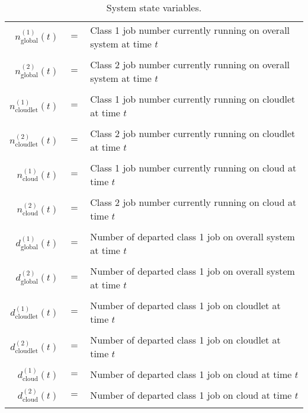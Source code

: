 \documentclass[10pt,a4paper]{article}
\begin{document}
\begin{table}[h!]
    \caption{System state variables.}
    \centering
    \small
    \label{table:StateVariables}
     \begin{tabular}{rcl}

      \toprule
      
      $n_{\text{global}}^{(1)}(t)$ & $ = $ & Class 1 job number currently running on overall system at time $t$ \\\\
	  $n_{\text{global}}^{(2)}(t)$ & $ = $ & Class 2 job number currently running on overall system at time $t$ \\\\
      
      $n_{\text{cloudlet}}^{(1)}(t)$ & $ = $ & Class 1 job number currently running on cloudlet at time $t$ \\\\
	  $n_{\text{cloudlet}}^{(2)}(t)$ & $ = $ & Class 2 job number currently running on cloudlet at time $t$ \\\\
         
      $n_{\text{cloud}}^{(1)}(t)$ & $ = $ & Class 1 job number currently running on cloud at time $t$ \\\\
	  $n_{\text{cloud}}^{(2)}(t)$ & $ = $ & Class 2 job number currently running on cloud at time $t$ \\\\
	  
	  $d_{\text{global}}^{(1)}(t)$ & $ = $ & Number of departed class 1 job on overall system at time $t$ \\\\
	  $d_{\text{global}}^{(2)}(t)$ & $ = $ & Number of departed class 1 job on overall system at time $t$ \\\\
      
      $d_{\text{cloudlet}}^{(1)}(t)$ & $ = $ & Number of departed class 1 job on cloudlet at time $t$ \\\\
	  $d_{\text{cloudlet}}^{(2)}(t)$ & $ = $ & Number of departed class 1 job on cloudlet at time $t$ \\\\
	  
	  $d_{\text{cloud}}^{(1)}(t)$ & $ = $ & Number of departed class 1 job on cloud at time $t$ \\\\
	  $d_{\text{cloud}}^{(2)}(t)$ & $ = $ & Number of departed class 1 job on cloud at time $t$ \\\\
    
      \bottomrule


    \end{tabular}
\end{table}
\newpage
\end{document}
